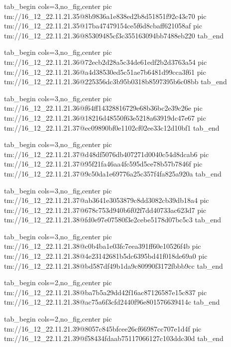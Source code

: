  
 
 
 
 

\qqSecCmtScr


\ifcmt
  tab_begin cols=3,no_fig,center
    pic tm://16_12_22.11.21.35@8b9836a1e838ed2b8d51851f92c43c70
    pic tm://16_12_22.11.21.35@17ba47479154ce5f6d8cbaff621058af
    pic tm://16_12_22.11.21.36@85309485cf3c355163094bb7488eb220
  tab_end
\fi


\ifcmt
  tab_begin cols=3,no_fig,center
    pic tm://16_12_22.11.21.36@72ecb2d28a5c34de61edf2b2d3763a54
    pic tm://16_12_22.11.21.36@a4d38530ed5c51ae7b6481d99cca3f61
    pic tm://16_12_22.11.21.36@225356dc3b95b0318b8597395b6c08bb
  tab_end
\fi


\ifcmt
  tab_begin cols=3,no_fig,center
    pic tm://16_12_22.11.21.36@f64ff14328816729e68b36bc2e39c26e
    pic tm://16_12_22.11.21.36@18216d48550f63e5218a63919dc47e67
    pic tm://16_12_22.11.21.37@ec09890bf0e1102cf02ee33c12d10bf1
  tab_end
\fi


\ifcmt
  tab_begin cols=3,no_fig,center
    pic tm://16_12_22.11.21.37@d48df5076db407271d0040c54d8dcab6
    pic tm://16_12_22.11.21.37@95f21fa46aa4fc595d5ce78b57b7846f
    pic tm://16_12_22.11.21.37@9c50da1e69776a25c357f4fa825a920a
  tab_end
\fi


\ifcmt
  tab_begin cols=3,no_fig,center
    pic tm://16_12_22.11.21.37@ab3641e3053879c8dd3082cb39db18a4
    pic tm://16_12_22.11.21.37@678c753d940b6f02f7dd40733ac623d7
    pic tm://16_12_22.11.21.38@fd0e97e07580f3e2cebe5178d07bc5c3
  tab_end
\fi


\ifcmt
  tab_begin cols=3,no_fig,center
    pic tm://16_12_22.11.21.38@c0b4ba1e03fc7eea391ff60e10526f4b
    pic tm://16_12_22.11.21.38@4e23142681b5dc6395bd41f018de69a0
    pic tm://16_12_22.11.21.38@bd587df49b1da9c80990f3172fbbb9cc
  tab_end
\fi


\ifcmt
  tab_begin cols=2,no_fig,center
    pic tm://16_12_22.11.21.38@ba7b5a29dd42f16ac87126587e15c837
    pic tm://16_12_22.11.21.38@ac75a6f3cfd2440f96e801576639414c
  tab_end
\fi


\ifcmt
  tab_begin cols=2,no_fig,center
    pic tm://16_12_22.11.21.39@8057c845bfcee26cf66987cc707e1d4f
    pic tm://16_12_22.11.21.39@f58434fdaab75117066127c103ddc30d
  tab_end
\fi


